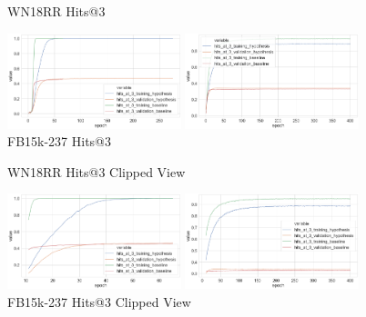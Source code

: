 
\begin{figure}[H]
	\parbox{.5\linewidth}{
   		\caption{WN18RR Hits@3}
   		\centering
    		\includegraphics[width=0.45\textwidth, height=0.2\textheight]{WN18RR_hits_at_3_Results}
		}
	\hfill
	\parbox{.5\linewidth}{
		\caption{FB15k-237 Hits@3}
   		\centering
		\includegraphics[width=0.45\textwidth, height=0.2\textheight]{FB15k-237_hits_at_3_Results}
		}
\end{figure}

\begin{figure}[H]
	\parbox{.5\linewidth}{
   		\caption{WN18RR Hits@3 Clipped View}
   		\centering
    		\includegraphics[width=0.45\textwidth, height=0.2\textheight]{WN18RR_hits_at_3_Results_Clipped}
		}
	\hfill
	\parbox{.5\linewidth}{
		\caption{FB15k-237 Hits@3  Clipped View}
   		\centering
		\includegraphics[width=0.45\textwidth, height=0.2\textheight]{FB15k-237_hits_at_3_Results_Clipped}
		}
\end{figure}


